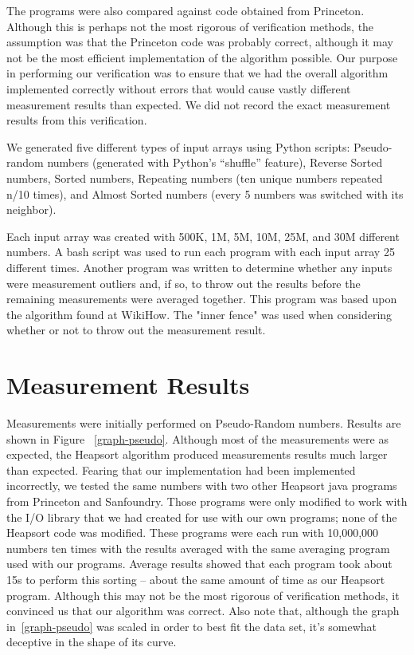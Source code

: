 \documentclass{article}
\begin{document}
The programs were also compared against code obtained from
Princeton\cite{Princeton}. Although this is perhaps not the most rigorous of verification methods,
the assumption was that the Princeton code was probably correct, although it may not be
the most efficient implementation of the algorithm possible. Our purpose in performing
our verification was to ensure that we had the overall algorithm implemented correctly
without errors that would cause vastly different measurement results than expected. We 
did not record the exact measurement results from this verification.

We generated five different types of input arrays using Python scripts: Pseudo-random numbers
(generated with Python's ``shuffle'' feature), Reverse Sorted numbers, Sorted numbers, 
Repeating numbers (ten unique numbers repeated n/10 times), and Almost Sorted numbers
(every 5 numbers was switched with its neighbor).

Each input array was created with 500K, 1M, 5M, 10M, 25M, and 30M different numbers.
A bash script was used to run each program with each input array 25 different times.
Another program was written to determine whether any inputs were measurement outliers
and, if so, to throw out the results before the remaining measurements were averaged 
together. This program was based upon the algorithm found at WikiHow\cite{WikiHow}.
The "inner fence" was used when considering whether or not to throw out the measurement
result.

\section{Measurement Results}
Measurements were initially performed on Pseudo-Random numbers. Results are shown in Figure
~\ref{graph-pseudo}. Although most of the measurements were as expected, the Heapsort
algorithm produced measurements results much larger than expected. Fearing that our
implementation had been implemented incorrectly, we tested the same numbers with two
other Heapsort java programs from Princeton\cite{Princeton} and Sanfoundry\cite{Sanfoundry}.
Those programs were only modified to work with the I/O library that we had created for use 
with our own programs; none of the Heapsort code was modified. These programs were each
run with 10,000,000 numbers ten times with the results averaged with the same averaging 
program used with our programs. Average results showed that each program took about 15s
to perform this sorting -- about the same amount of time as our Heapsort program. Although
this may not be the most rigorous of verification methods, it convinced us that our algorithm
was correct. Also note that, although the graph in~\ref{graph-pseudo} was
scaled in order to best fit the data set, it's somewhat deceptive in
the shape of its curve. 
\end{document}
